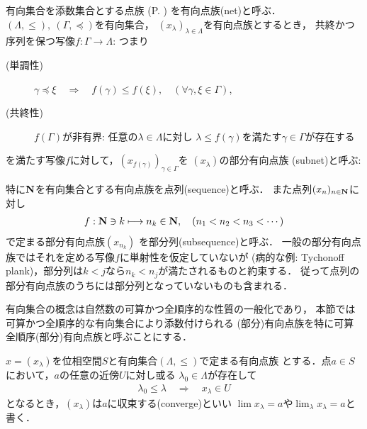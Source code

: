 	\begin{screen}
		\begin{dfn}[有向点族]
			有向集合を添数集合とする点族
			(P. \pageref{dfn:family_collection})
			を有向点族(net)と呼ぶ．
			$(\Lambda,\leq),\ (\Gamma,\preceq)$を有向集合，
			$(x_\lambda)_{\lambda \in \Lambda}$を有向点族とするとき，
			共終かつ序列を保つ写像$f:\Gamma \longrightarrow \Lambda$:
			つまり
			\begin{description}
				\item[(単調性)] $\gamma \preceq \xi \quad \Longrightarrow \quad
					f(\gamma) \leq f(\xi),\quad (\forall \gamma,\xi \in \Gamma)$,
				\item[(共終性)] $f(\Gamma)$が非有界:
					任意の$\lambda \in \Lambda$に対し
					$\lambda \leq f(\gamma)$を満たす$\gamma \in \Gamma$が存在する
			\end{description}
			を満たす写像$f$に対して，$\left(x_{f(\gamma)}\right)_{\gamma \in \Gamma}$を
			$(x_\lambda)$の部分有向点族
			(subnet)と呼ぶ:
		\end{dfn}
	\end{screen}
	特に$\mathbf{N}$を有向集合とする有向点族を点列(sequence)と呼ぶ．
	また点列$(x_n)_{n \in \mathbf{N}}$に対し
	\begin{align}
		f:\mathbf{N} \ni k \longmapsto n_k \in \mathbf{N},
		\quad (n_1 < n_2 < n_3 < \cdots)
	\end{align}
	で定まる部分有向点族$\left(x_{n_k}\right)$
	を部分列(subsequence)と呼ぶ．
	一般の部分有向点族ではそれを定める写像$f$に単射性を仮定していないが
	(病的な例: Tychonoff plank)，部分列は$k < j$なら$n_k < n_j$が満たされるものと約束する．
	従って点列の部分有向点族のうちには部分列となっていないものも含まれる．
	
	有向集合の概念は自然数の可算かつ全順序的な性質の一般化であり，
	本節では可算かつ全順序的な有向集合により添数付けられる
	(部分)有向点族を特に可算全順序(部分)有向点族と呼ぶことにする．
	
	\begin{screen}
		\begin{dfn}
			$x = (x_\lambda)$を位相空間$S$と有向集合$(\Lambda,\leq)$で定まる有向点族
			とする．点$a \in S$において，$a$の任意の近傍$U$に対し或る
			$\lambda_0 \in \Lambda$が存在して
			\begin{align}
				\lambda_0 \leq \lambda \quad \Longrightarrow \quad
				x_\lambda \in U
			\end{align}
			となるとき，$(x_\lambda)$は$a$に収束する(converge)といい
			$\lim x_\lambda = a$や$\lim_{\lambda} x_\lambda = a$と書く．
		\end{dfn}
	\end{screen}
	
